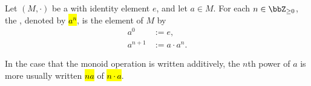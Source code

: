 \begin{definition} \label{definition:power_of_a_monoid_element_by_a_nonnegative_integer}
Let $(M,\cdot)$ be a  with identity element $e$, and let $a \in M$. For each $n \in \bbZ_{\geq 0}$, the , denoted by \hl{$a^n$}, is the element of $M$  by
\begin{align*}
    a^0 &:= e, \\
    a^{n+1} &:= a \cdot a^n.
\end{align*}

In the case that the monoid operation is written additively, the $n$th power of $a$ is more usually written \hl{$na$} of \hl{$n \cdot a$}.
\end{definition}
